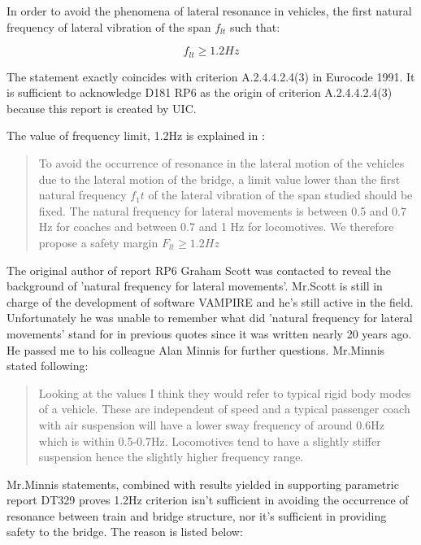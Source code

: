 \begin{appendices}
In order to avoid the phenomena of lateral resonance in vehicles, the first natural frequency of lateral vibration of the span $f_{lt}$ such that:

\begin{equation}
f_{lt} \geq 1.2Hz
\end{equation}

The statement exactly coincides with criterion A.2.4.4.2.4(3) in Eurocode 1991. It is sufficient to acknowledge D181 RP6 as the origin of criterion A.2.4.4.2.4(3) because this report is created by UIC.

The value of frequency limit, 1.2Hz is explained in \cite[p3.2: Criterion 2]{d181}:

\begin{quote}
To avoid the occurrence of resonance in the lateral motion of the vehicles due to the lateral motion of the bridge, a limit value lower than the first natural frequency $f_1t$ of the lateral vibration of the span studied should be fixed. The natural frequency for lateral movements is between 0.5 and 0.7 Hz for coaches and between 0.7 and 1 Hz for locomotives. We therefore propose a safety margin $F_{lt} \geq 1.2Hz$
\end{quote}

The original author of report RP6 Graham Scott was contacted to reveal the background of 'natural frequency for lateral movements'. Mr.Scott is still in charge of the development of software VAMPIRE and he's still active in the field. Unfortunately he was unable to remember what did 'natural frequency for lateral movements' stand for in previous quotes since it was written nearly 20 years ago. He passed me to his colleague Alan Minnis for further questions. Mr.Minnis stated following:

\begin{quote}
Looking at the values I think they would refer to typical rigid body modes of a vehicle.  These are independent of speed and a typical passenger coach with air suspension will have a lower sway frequency of around 0.6Hz which is within 0.5-0.7Hz.  Locomotives tend to have a slightly stiffer suspension hence the slightly higher frequency range.
\end{quote}

Mr.Minnis statements, combined with results yielded in supporting parametric report DT329 proves 1.2Hz criterion isn't sufficient in avoiding the occurrence of resonance between train and bridge structure, nor it's sufficient in providing safety to the bridge. The reason is listed below:


\end{appendices}
